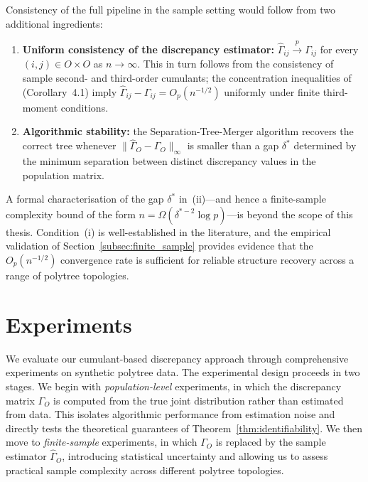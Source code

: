 \documentclass[11pt,a4paper]{article}
\numberwithin{equation}{section}
\begin{document}
Consistency of the full pipeline in the sample setting would follow from two
additional ingredients:
\begin{enumerate}[label=(\roman*)]
  \item \textbf{Uniform consistency of the discrepancy estimator:}
    $\hat\Gamma_{ij}\xrightarrow{p}\Gamma_{ij}$ for every $(i,j)\in O\times O$
    as $n\to\infty$.  This in turn follows from the consistency of sample
    second- and third-order cumulants; the concentration inequalities of
    \citet{tramontano:monod:drton:2022} (Corollary~4.1) imply
    $\hat\Gamma_{ij}-\Gamma_{ij}=O_p(n^{-1/2})$ uniformly under finite
    third-moment conditions.
  \item \textbf{Algorithmic stability:} the Separation-Tree-Merger algorithm
    recovers the correct tree whenever $\|\hat\Gamma_O-\Gamma_O\|_\infty$ is
    smaller than a gap $\delta^*$ determined by the minimum separation between
    distinct discrepancy values in the population matrix.
\end{enumerate}

A formal characterisation of the gap $\delta^*$ in~(ii)—and hence a
finite-sample complexity bound of the form $n=\Omega(\delta^{*-2}\log p)$—is
beyond the scope of this thesis.  Condition~(i) is well-established in the
literature, and the empirical validation of Section~\ref{subsec:finite_sample}
provides evidence that the $O_p(n^{-1/2})$ convergence rate is sufficient for
reliable structure recovery across a range of polytree topologies.

\section{Experiments}
\label{sec:experiments}

We evaluate our cumulant-based discrepancy approach through comprehensive experiments on synthetic polytree data. The experimental design proceeds in two stages. We begin with \emph{population-level} experiments, in which the discrepancy matrix $\Gamma_O$ is computed from the true joint distribution rather than estimated from data. This isolates algorithmic performance from estimation noise and directly tests the theoretical guarantees of Theorem~\ref{thm:identifiability}. We then move to \emph{finite-sample} experiments, in which $\Gamma_O$ is replaced by the sample estimator $\hat\Gamma_O$, introducing statistical uncertainty and allowing us to assess practical sample complexity across different polytree topologies.
\end{document}
